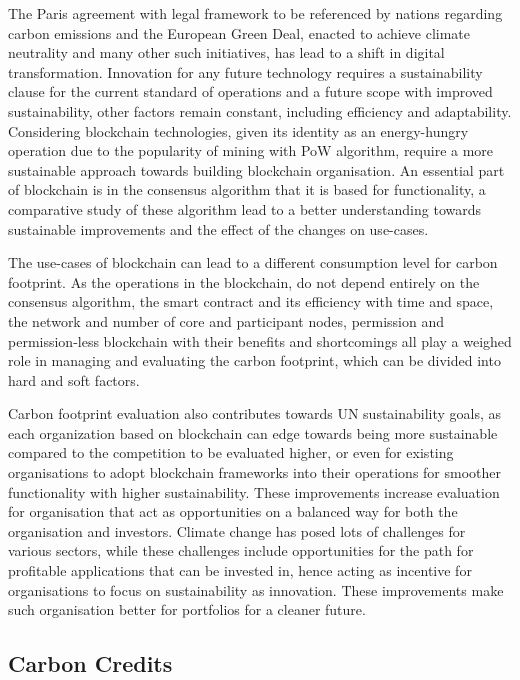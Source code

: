 \documentclass[11pt, a4paper]{article}
\begin{document}
The Paris agreement  with legal framework to be referenced by nations regarding carbon emissions and the European Green Deal, enacted to achieve climate neutrality and many other such initiatives, has lead to a shift in digital transformation. Innovation for any future technology requires a sustainability clause for the current standard of operations and a future scope with improved sustainability, other factors remain constant, including efficiency and adaptability.\cite{franke_designing_2020} 
Considering blockchain technologies, given its identity as an energy-hungry operation due to the popularity of mining with PoW algorithm, require a more sustainable approach towards building blockchain organisation. An essential part of blockchain is in the consensus algorithm that it is based for functionality, a comparative study of these algorithm lead to a better understanding towards sustainable improvements and the effect of the changes on use-cases. \cite{radziwill_blockchain_2018} 

The use-cases of blockchain can lead to a different consumption level for carbon footprint. As the operations in the blockchain, do not depend entirely on the consensus algorithm, the smart contract and its efficiency with time and space, the network and number of core and participant nodes, permission and permission-less blockchain with their benefits and shortcomings all play a weighed role in managing and evaluating the carbon footprint, which can be divided into hard and soft factors. \cite{franke_designing_2020} 

Carbon footprint evaluation also contributes towards UN sustainability goals, as each organization based on blockchain can edge towards being more sustainable compared to the competition to be evaluated higher, or even for existing organisations to adopt blockchain frameworks into their operations for smoother functionality with higher sustainability. \cite{kim_blockchain_2020} These improvements increase evaluation for organisation that act as opportunities on a balanced way for both the organisation and investors. Climate change has posed lots of challenges for various sectors, while these challenges include opportunities for the path for profitable applications that can be invested in, hence acting as incentive for organisations to focus on sustainability as innovation. These improvements make such organisation better for portfolios for a cleaner future. \cite{de_franco_carbon_2018}


\subsection*{Carbon Credits }
\end{document}
